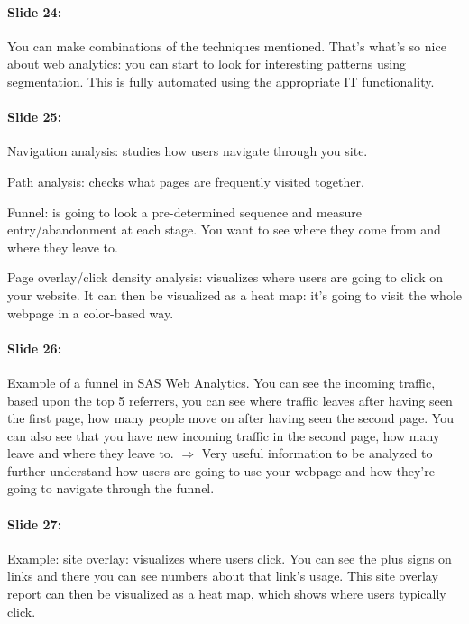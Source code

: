 \documentclass[10pt,a4paper]{report}
\begin{document}
\paragraph{Slide 24:}You can make combinations of the techniques mentioned. That's what's so nice about web analytics: you can start to look for interesting patterns using segmentation. This is fully automated using the appropriate IT functionality. 

\paragraph{Slide 25:}Navigation analysis: studies how users navigate through you site.
\begin{description}
\item Path analysis: checks what pages are frequently visited together. 
\item Funnel: is going to look a pre-determined sequence and measure entry/abandonment at each stage. You want to see where they come from and where they leave to. 
\item Page overlay/click density analysis: visualizes where users are going to click on your website. It can then be visualized as a heat map: it's going to visit the whole webpage in a color-based way.
\end{description}

\paragraph{Slide 26:}Example of a funnel in SAS Web Analytics. You can see the incoming traffic, based upon the top 5 referrers, you can see where traffic leaves after having seen the first page, how many people move on after having seen the second page. You can also see that you have new incoming traffic in the second page, how many leave and where they leave to. $\Rightarrow$ Very useful information to be analyzed to further understand how users are going to use your webpage and how they're going to navigate through the funnel.

\paragraph{Slide 27:}Example: site overlay: visualizes where users click. You can see the plus signs on links and there you can see numbers about that link's usage. This site overlay report can then be visualized as a heat map, which shows where users typically click.
\end{document}
